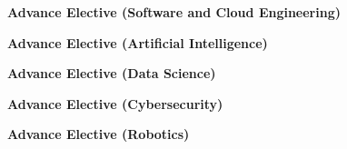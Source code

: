 \documentclass[a4paper,12pt]{article}
\begin{document}


\thispagestyle{empty}
\vspace*{\fill}
\begin{center}
    {\Large \textbf{Advance Elective (Software and Cloud Engineering)}}
\end{center}
\vspace*{\fill}
\newpage








\thispagestyle{empty}
\vspace*{\fill}
\begin{center}
    {\Large \textbf{Advance Elective (Artificial Intelligence)}}
\end{center}
\vspace*{\fill}
\newpage








\thispagestyle{empty}
\vspace*{\fill}
\begin{center}
    {\Large \textbf{Advance Elective (Data Science)}}
\end{center}
\vspace*{\fill}
\newpage








\thispagestyle{empty}
\vspace*{\fill}
\begin{center}
    {\Large \textbf{Advance Elective (Cybersecurity)}}
\end{center}
\vspace*{\fill}
\newpage








\thispagestyle{empty}
\vspace*{\fill}
\begin{center}
    {\Large \textbf{Advance Elective (Robotics)}}
\end{center}
\vspace*{\fill}
\newpage
\end{document}
